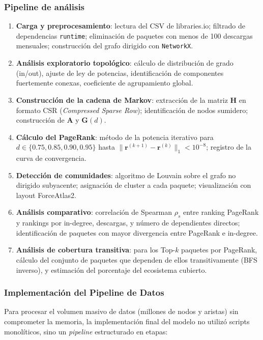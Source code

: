 \subsubsection{Pipeline de análisis}
\begin{enumerate}
    \item \textbf{Carga y preprocesamiento}: lectura del CSV de libraries.io;
          filtrado de dependencias \texttt{runtime}; eliminación de paquetes
          con menos de 100 descargas mensuales; construcción del grafo dirigido
          con \texttt{NetworkX}.
    \item \textbf{Análisis exploratorio topológico}: cálculo de distribución
          de grado (in/out), ajuste de ley de potencias, identificación de
          componentes fuertemente conexas, coeficiente de agrupamiento global.
    \item \textbf{Construcción de la cadena de Markov}: extracción de la
          matriz $\mathbf{H}$ en formato CSR (\textit{Compressed Sparse Row});
          identificación de nodos sumidero; construcción de $\mathbf{A}$ y
          $\mathbf{G}(d)$.
    \item \textbf{Cálculo del PageRank}: método de la potencia iterativo para
          $d \in \{0.75, 0.85, 0.90, 0.95\}$ hasta
          $\|\mathbf{r}^{(k+1)}-\mathbf{r}^{(k)}\|_1 < 10^{-8}$;
          registro de la curva de convergencia.
    \item \textbf{Detección de comunidades}: algoritmo de Louvain sobre el
          grafo no dirigido subyacente; asignación de cluster a cada paquete;
          visualización con layout ForceAtlas2.
    \item \textbf{Análisis comparativo}: correlación de Spearman $\rho_s$
          entre ranking PageRank y rankings por in-degree, descargas, y
          número de dependientes directos; identificación de paquetes con
          mayor divergencia entre PageRank e in-degree.
    \item \textbf{Análisis de cobertura transitiva}: para los Top-$k$
          paquetes por PageRank, cálculo del conjunto de paquetes que
          dependen de ellos transitivamente (BFS inverso), y estimación
          del porcentaje del ecosistema cubierto.
\end{enumerate}

\subsubsection{Implementación del Pipeline de Datos}
Para procesar el volumen masivo de datos (millones de nodos y aristas) sin comprometer la memoria, la implementación final del modelo no utilizó scripts monolíticos, sino un \textit{pipeline} estructurado en etapas:

